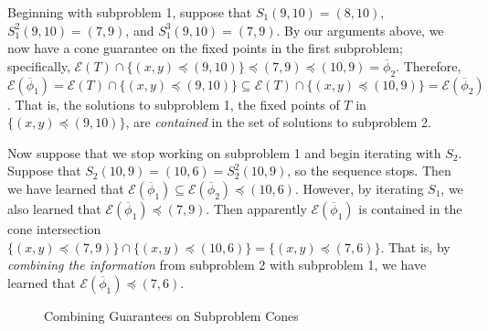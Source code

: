 \documentclass[11pt,reqno]{amsart}
\theoremstyle{definition}
\numberwithin{equation}{section}
\newcommand{\ol}{\overline}
\newcommand{\pre}{\phi}
\newcommand{\sub}{\subseteq}
\newcommand{\fix}{\mathcal{E}}
\newcommand{\peq}{\preceq}
\newcommand{\toppre}{\ol{\pre}}
\begin{document}
Beginning with subproblem 1, suppose that $S_1 (9,10) = (8,10)$, $S_1^2 (9,10) = (7,9)$, and $S_1^3 (9,10) = (7,9)$.
By our arguments above, we now have a cone guarantee on the fixed points in the first subproblem; specifically, $\fix(T) \cap \{(x,y) \peq (9,10)\} \peq (7,9) \peq (10,9) = \toppre_2$.
Therefore, $\fix(\toppre_1) = \fix(T) \cap \{(x,y) \peq (9,10)\} \sub \fix(T) \cap \{(x,y) \peq (10,9)\} = \fix(\toppre_2)$. 
That is, the solutions to subproblem 1, the fixed points of $T$ in $\{(x,y) \peq (9,10)\}$, are \emph{contained} in the set of solutions to subproblem 2. 

Now suppose that we stop working on subproblem 1 and begin iterating with $S_2$.
Suppose that $S_2(10,9) = (10,6) = S_2^2(10,9)$, so the sequence stops.
Then we have learned that $\fix(\toppre_1) \sub \fix(\toppre_2) \peq (10,6)$. 
However, by iterating $S_1$, we also learned that $\fix(\toppre_1) \peq (7,9)$. 
Then apparently $\fix(\toppre_1)$ is contained in the cone intersection $\{(x,y) \peq (7,9)\} \cap \{(x,y) \peq (10, 6)\} = \{(x,y) \peq (7,6) \}$. 
That is, by \emph{combining the information} from subproblem 2 with subproblem 1, we have learned that $\fix(\toppre_1) \peq (7,6)$. 

\begin{figure} \label{fig:rectangles}
\caption{Combining Guarantees on Subproblem Cones}
\end{figure}
\end{document}
